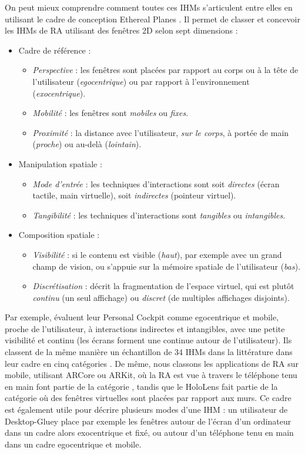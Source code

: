 On peut mieux comprendre comment toutes ces IHMs s'articulent entre elles en utilisant le cadre de conception Ethereal Planes \citep{Ens2014a}. Il permet de classer et concevoir les IHMs de RA utilisant des fenêtres 2D selon sept dimensions :
\begin{itemize}
  \item Cadre de référence :
  \begin{itemize}
    \item \emph{Perspective} : les fenêtres sont placées par rapport au corps ou à la tête de l'utilisateur (\emph{egocentrique}) ou par rapport à l'environnement (\emph{exocentrique}).
    \item \emph{Mobilité} : les fenêtres sont \emph{mobiles} ou \emph{fixes}.
    \item \emph{Proximité} : la distance avec l'utilisateur, \emph{sur le corps}, à portée de main (\emph{proche}) ou au-delà (\emph{lointain}).
  \end{itemize}
  \item Manipulation spatiale :
  \begin{itemize}
    \item \emph{Mode d'entrée} : les techniques d'interactions sont soit \emph{directes} (écran tactile, main virtuelle), soit \emph{indirectes} (pointeur virtuel).
    \item \emph{Tangibilité} : les techniques d'interactions sont \emph{tangibles} ou \emph{intangibles}.
  \end{itemize}
  \item Composition spatiale :
  \begin{itemize}
    \item \emph{Visibilité} : si le contenu est visible (\emph{haut}), par exemple avec un grand champ de vision, ou s'appuie sur la mémoire spatiale de l'utilisateur (\emph{bas}).
    \item \emph{Discrétisation} : décrit la fragmentation de l'espace virtuel, qui est plutôt \emph{continu} (un seul affichage) ou \emph{discret} (de multiples affichages disjoints).
  \end{itemize}
\end{itemize}
\medskip

Par exemple, \cite{Ens2014a} évaluent leur Personal Cockpit comme egocentrique et mobile, proche de l'utilisateur, à interactions indirectes et intangibles, avec une petite visibilité et continu (les écrans forment une  continue autour de l'utilisateur). Ils classent de la même manière un échantillon de 34 IHMs dans la littérature dans leur cadre en cinq catégories . De même, nous classons les applications de RA sur mobile, utilisant ARCore ou ARKit, où la RA est vue à travers le téléphone tenu en main font partie de la catégorie , tandis que le HoloLens fait partie de la catégorie  où des fenêtres virtuelles sont placées par rapport aux murs. Ce cadre est également utile pour décrire plusieurs modes d'une IHM : un utilisateur de Desktop-Gluey place par exemple les fenêtres autour de l'écran d'un ordinateur dans un cadre alors exocentrique et fixé, ou autour d'un téléphone tenu en main dans un cadre egocentrique et mobile.

